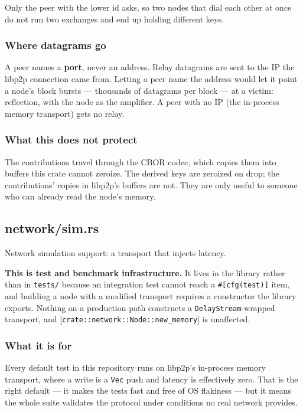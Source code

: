 \documentclass[11pt,a4paper]{article}
\begin{document}
Only the peer with the lower id asks, so two nodes that dial each other at
once do not run two exchanges and end up holding different keys.

\subsubsection{Where datagrams go}

A peer names a \textbf{port}, never an address. Relay datagrams are sent to the
IP the libp2p connection came from. Letting a peer name the address would
let it point a node's block bursts — thousands of datagrams per block — at
a victim: reflection, with the node as the amplifier. A peer with no IP
(the in-process memory transport) gets no relay.

\subsubsection{What this does not protect}

The contributions travel through the CBOR codec, which copies them into
buffers this crate cannot zeroize. The derived keys are zeroized on drop;
the contributions' copies in libp2p's buffers are not. They are only useful
to someone who can already read the node's memory.

\subsection{network/sim.rs}
Network simulation support: a transport that injects latency.

\textbf{This is test and benchmark infrastructure.} It lives in the library
rather than in \texttt{tests/} because an integration test cannot reach a
\texttt{\#[cfg(test)]} item, and building a node with a modified transport requires
a constructor the library exports. Nothing on a production path constructs a
\texttt{DelayStream}-wrapped transport, and [\texttt{crate::network::Node::new\_memory}] is unaffected.

\subsubsection{What it is for}

Every default test in this repository runs on libp2p's in-process memory
transport, where a write is a \texttt{Vec} push and latency is effectively zero.
That is the right default — it makes the tests fast and free of OS
flakiness — but it means the whole suite validates the protocol under
conditions no real network provides.
\end{document}
